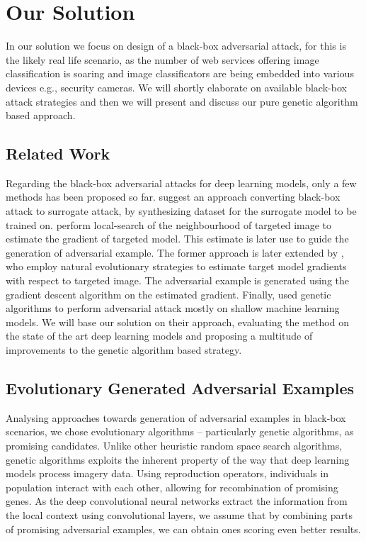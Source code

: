 \chapter{Our Solution}
\label{sec:solution}
In our solution we focus on design of a black-box adversarial attack, for this is the likely real life scenario, as the number of web services offering image classification is soaring and image classificators are being embedded into various devices e.g., security cameras. We will shortly elaborate on available black-box attack strategies and then we will present and discuss our pure genetic algorithm based approach.

\section{Related Work}
Regarding the black-box adversarial attacks for deep learning models, only a few methods has been proposed so far. \cite{DBLP:journals/corr/PapernotMGJCS16} suggest an approach converting black-box attack to surrogate attack, by synthesizing dataset for the surrogate model to be trained on. \cite{8014906} perform local-search of the neighbourhood of targeted image to estimate the gradient of targeted model. This estimate is later use to guide the generation of adversarial example. The former approach is later extended by \cite{DBLP:journals/corr/abs-1804-08598}, who employ natural evolutionary strategies to estimate target model gradients with respect to targeted image. The adversarial example is generated using the gradient descent algorithm on the estimated gradient. Finally, \cite{Vidnerova:2016:EGA:2955129.2955178} used genetic algorithms to perform adversarial attack mostly on shallow machine learning models. We will base our solution on their approach, evaluating the method on the state of the art deep learning models and proposing a multitude of improvements to the genetic algorithm based strategy.

\section{Evolutionary Generated Adversarial Examples}
\label{sec:pga}
Analysing approaches towards generation of adversarial examples in black-box scenarios, we chose evolutionary algorithms -- particularly genetic algorithms, as promising candidates. Unlike other heuristic random space search algorithms, genetic algorithms exploits the inherent property of the way that deep learning models process imagery data. Using reproduction operators, individuals in population interact with each other, allowing for recombination of promising genes. As the deep convolutional neural networks extract the information from the local context using convolutional layers, we assume that by combining parts of promising adversarial examples, we can obtain ones scoring even better results.

